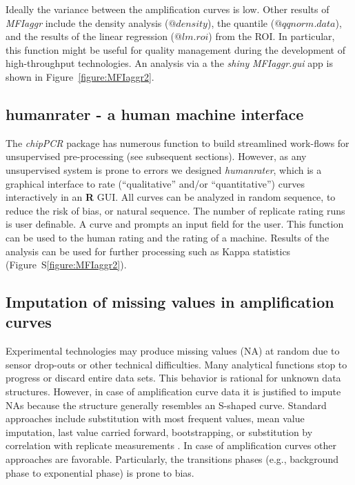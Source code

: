 \documentclass[twocolumn]{bmcart}%
\begin{document}
Ideally the variance between the amplification curves is low. Other results of 
\textsl{MFIaggr} include the density analysis ($@density$), the quantile 
($@qqnorm.data$), and the results of the linear regression ($@lm.roi$) from the 
ROI. In particular, this function might be useful for quality management during 
the development of high-throughput technologies. An analysis via a the 
\emph{shiny} \textsl{MFIaggr.gui} app is shown in Figure~\ref{figure:MFIaggr2}.

\subsection*{humanrater - a human machine interface}

The \emph{chipPCR} package has numerous function to 
build streamlined work-flows for unsupervised pre-processing (see subsequent 
sections). However, as any unsupervised system is prone to errors we designed 
\textsl{humanrater}, which is a graphical interface to rate (``qualitative'' 
and/or ``quantitative'') curves interactively in an \textbf{R} GUI. All curves 
can be analyzed in random sequence, to reduce the risk of bias, or natural 
sequence. The number of replicate 
rating runs is user definable. A curve and prompts an input field for the user. 
This function can be used to 	 the human rating and the rating of a machine. 
Results of the analysis can be used for further processing such as Kappa 
statistics (Figure~S\ref{figure:MFIaggr2}).

\subsection*{Imputation of missing values in amplification curves}

  Experimental technologies may produce missing values (NA) at 
random due to sensor drop-outs or other technical difficulties. Many analytical 
functions stop to progress or discard entire data sets. This 
behavior is rational for unknown data structures. However, in case of 
amplification curve data it is justified to impute NAs because the structure 
generally resembles an S-shaped curve. Standard approaches include substitution 
with most frequent values, mean value imputation, last value carried forward, 
bootstrapping, or substitution by correlation with replicate measurements 
\cite{Harrell_2001}. In case of amplification curves other approaches are 
favorable. Particularly, the transitions phases (e.g., background phase to 
exponential phase) is prone to bias.
\end{document}
